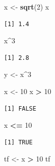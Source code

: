 \documentclass[
]{article}
\newenvironment{Shaded}{\begin{snugshade}}{\end{snugshade}}
\newcommand{\DecValTok}[1]{\textcolor[rgb]{0.00,0.00,0.81}{#1}}
\newcommand{\FunctionTok}[1]{\textcolor[rgb]{0.13,0.29,0.53}{\textbf{#1}}}
\newcommand{\NormalTok}[1]{#1}
\newcommand{\OtherTok}[1]{\textcolor[rgb]{0.56,0.35,0.01}{#1}}
\newcommand{\SpecialCharTok}[1]{\textcolor[rgb]{0.81,0.36,0.00}{\textbf{#1}}}
\begin{document}
\begin{Shaded}
\begin{Highlighting}[]
\NormalTok{x }\OtherTok{\textless{}{-}} \FunctionTok{sqrt}\NormalTok{(}\DecValTok{2}\NormalTok{)}
\NormalTok{x}
\end{Highlighting}
\end{Shaded}

\begin{verbatim}
[1] 1.4
\end{verbatim}

\begin{Shaded}
\begin{Highlighting}[]
\NormalTok{x}\SpecialCharTok{\^{}}\DecValTok{3}
\end{Highlighting}
\end{Shaded}

\begin{verbatim}
[1] 2.8
\end{verbatim}

\begin{Shaded}
\begin{Highlighting}[]
\NormalTok{y }\OtherTok{\textless{}{-}}\NormalTok{ x}\SpecialCharTok{\^{}}\DecValTok{3}
\end{Highlighting}
\end{Shaded}

\begin{Shaded}
\begin{Highlighting}[]
\NormalTok{x }\OtherTok{\textless{}{-}} \DecValTok{10}
\NormalTok{x }\SpecialCharTok{\textgreater{}} \DecValTok{10}
\end{Highlighting}
\end{Shaded}

\begin{verbatim}
[1] FALSE
\end{verbatim}

\begin{Shaded}
\begin{Highlighting}[]
\NormalTok{x }\SpecialCharTok{\textless{}=} \DecValTok{10}
\end{Highlighting}
\end{Shaded}

\begin{verbatim}
[1] TRUE
\end{verbatim}

\begin{Shaded}
\begin{Highlighting}[]
\NormalTok{tf }\OtherTok{\textless{}{-}}\NormalTok{ x }\SpecialCharTok{\textgreater{}} \DecValTok{10}
\NormalTok{tf}
\end{Highlighting}
\end{Shaded}
\end{document}
